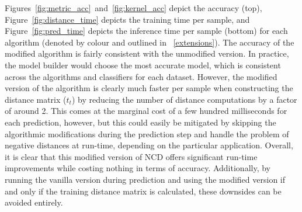 \documentclass[preprint,12pt]{elsarticle}
\begin{document}
Figures~\ref{fig:metric_acc}~and~\ref{fig:kernel_acc} depict the accuracy (top), Figure~\ref{fig:distance_time} depicts the   training time per sample, and Figure~\ref{fig:pred_time}  depicts the inference time per sample (bottom) for each algorithm (denoted by colour and outlined in ~\ref{extensions}). 
The accuracy of the modified algorithm is fairly consistent with the unmodified version. 
In practice, the model builder would choose the most accurate model, which is consistent across the algorithms and classifiers for each dataset. 
However, the modified version of the algorithm is clearly much faster per sample when constructing the distance matrix ($t_t$) by reducing the number of distance computations by a factor of around 2. 
This comes at the marginal cost of a few hundred milliseconds for each prediction, however, but this could easily be mitigated by skipping the algorithmic modifications during the prediction step and handle the problem of negative distances at run-time, depending on the particular application. 
Overall, it is clear that this modified version of NCD offers significant run-time improvements while costing nothing in terms of accuracy. 
Additionally, by running the vanilla version during prediction and using the modified version if and only if the training distance matrix is calculated, these downsides can be avoided entirely. 
\end{document}
